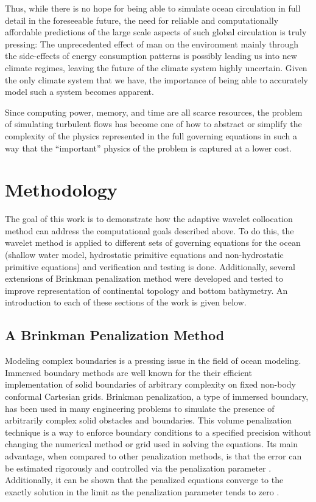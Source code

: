 Thus, while there is no hope for being able to simulate ocean
circulation in full detail in the foreseeable future, the need for
reliable and computationally affordable predictions of the large scale
aspects of such global circulation is truly pressing: The
unprecedented effect of man on the environment mainly through the
side-effects of energy consumption patterns is possibly leading us
into new climate regimes, leaving the future of the climate system
highly uncertain.  Given the only climate system that we have, the
importance of being able to accurately model such a system becomes
apparent.

Since computing power, memory, and time are all scarce resources, the
problem of simulating turbulent flows has become one of how to
abstract or simplify the complexity of the physics represented in the
full governing equations in such a way that the ``important'' physics
of the problem is captured at a lower cost.

\section{Methodology}

The goal of this work is to demonstrate how the adaptive wavelet collocation method can address the computational goals described above.  To do this, the wavelet method is applied to different sets of governing equations for the ocean (shallow water model, hydrostatic primitive equations and non-hydrostatic primitive equations) and verification and testing is done.  Additionally, several extensions of Brinkman penalization method were developed and tested to improve representation of continental topology and bottom bathymetry.  An introduction to each of these sections of the work is given below.  

\subsection{A Brinkman Penalization Method}
\label{sec:brinkman_penal_chapter1}

Modeling complex boundaries is a pressing issue in the field of ocean modeling.  Immersed boundary methods are well known for the their efficient implementation of solid boundaries of arbitrary complexity on fixed non-body conformal Cartesian grids.  Brinkman penalization, a type of immersed boundary, has been used in many engineering problems to simulate the presence of arbitrarily complex solid obstacles and boundaries.  This volume penalization technique is a way to enforce boundary conditions to a specified precision without changing the numerical method or grid used in solving the equations.  Its main advantage, when compared to other penalization methods, is that the error can be estimated rigorously and controlled via the penalization parameter \cite{99ABF}.  Additionally, it can be shown that the penalized equations converge to the exactly solution in the limit as the penalization parameter tends to zero \cite{99Angot}.  

